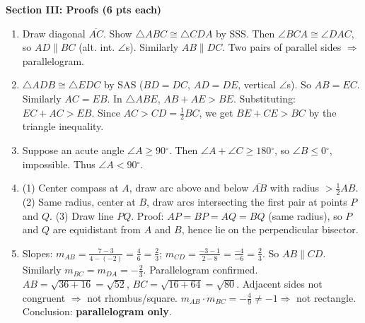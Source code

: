 \documentclass[12pt,addpoints]{exam}
\newcommand{\deg}{{}^\circ}
\begin{document}
\vspace{0.3cm}
\noindent\textbf{Section III: Proofs (6 pts each)}
\begin{enumerate}[label=\arabic*.]
  \item[26.] Draw diagonal $\overline{AC}$. Show $\triangle ABC \cong \triangle CDA$ by SSS. Then $\angle BCA \cong \angle DAC$, so $AD \parallel BC$ (alt. int. $\angle$s). Similarly $AB \parallel DC$. Two pairs of parallel sides $\Rightarrow$ parallelogram.
  \item[27.] $\triangle ADB \cong \triangle EDC$ by SAS ($BD=DC$, $AD=DE$, vertical $\angle$s). So $AB=EC$. Similarly $AC=EB$. In $\triangle ABE$, $AB+AE > BE$. Substituting: $EC+AC > EB$. Since $AC > CD = \frac{1}{2}BC$, we get $BE+CE > BC$ by the triangle inequality.
  \item[28.] Suppose an acute angle $\angle A \geq 90\deg$. Then $\angle A + \angle C \geq 180\deg$, so $\angle B \leq 0\deg$, impossible. Thus $\angle A < 90\deg$.
  \item[29.] (1) Center compass at $A$, draw arc above and below $\overline{AB}$ with radius $> \frac{1}{2}AB$. (2) Same radius, center at $B$, draw arcs intersecting the first pair at points $P$ and $Q$. (3) Draw line $PQ$. Proof: $AP = BP = AQ = BQ$ (same radius), so $P$ and $Q$ are equidistant from $A$ and $B$, hence lie on the perpendicular bisector.
  \item[30.] Slopes: $m_{AB} = \frac{7-3}{4-(-2)} = \frac{4}{6} = \frac{2}{3}$; $m_{CD} = \frac{-3-1}{2-8} = \frac{-4}{-6} = \frac{2}{3}$. So $AB \parallel CD$. Similarly $m_{BC} = m_{DA} = -\frac{2}{3}$. Parallelogram confirmed. $AB = \sqrt{36+16} = \sqrt{52}$, $BC = \sqrt{16+64} = \sqrt{80}$. Adjacent sides not congruent $\Rightarrow$ not rhombus/square. $m_{AB} \cdot m_{BC} = -\frac{4}{9} \neq -1 \Rightarrow$ not rectangle. Conclusion: \textbf{parallelogram only}.
\end{enumerate}
\end{document}
